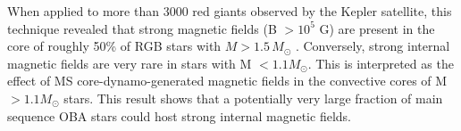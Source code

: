 When applied to more than 3000 red giants observed by the Kepler satellite, this technique revealed that strong magnetic fields (B $> 10^5$ G) are present in the core of roughly 50\% of RGB stars with $M \! > \! 1.5 \, M_\odot$ \citep{Stello_2016,Stello_2016a}. Conversely, strong internal magnetic fields are very rare in stars with M $< 1.1M_\odot$. This is interpreted as the effect of MS core-dynamo-generated magnetic fields in the convective cores of M $> 1.1M_\odot$ stars. This result shows that a potentially very large fraction of main sequence OBA stars could host strong internal magnetic fields.



